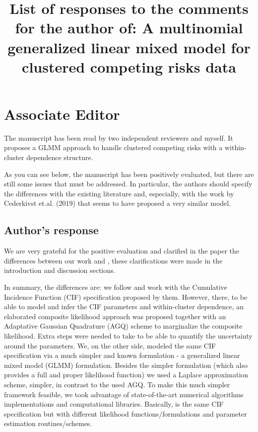 \documentclass[a4paper,12pt]{article}
\title{

  List of responses to the comments for the author of:
  A multinomial generalized linear mixed model for clustered competing
  risks data

}
\begin{document}
\maketitle

\section*{Associate Editor}

The manuscript has been read by two independent reviewers and myself. It
proposes a GLMM approach to handle clustered competing risks with a
within-cluster dependence structure.

As you can see below, the manuscript has been positively evaluated, but
there are still some issues that must be addressed. In particular, the
authors should specify the differences with the existing literature and,
especially, with the work by Cederkivst et.al. (2019) that seems to have
proposed a very similar model.

\subsection*{Author's response}

We are very grateful for the positive evaluation and clarified in the
paper the differences between our work and \cite{SCHEIKE}, these
clarifications were made in the introduction and discussion sections.

In summary, the differences are: we follow \cite{SCHEIKE} and work with
the Cumulative Incidence Function (CIF) specification proposed by
them. However, there, to be able to model and infer the CIF parameters
and within-cluster dependence, an elaborated composite likelihood
approach was proposed together with an Adaptative Gaussian Quadrature
(AGQ) scheme to marginalize the composite likelihood. Extra steps were
needed to take to be able to quantify the uncertainty around the
parameters. We, on the other side, modeled the same CIF specification
via a much simpler and known formulation - a generalized linear mixed
model (GLMM) formulation. Besides the simpler formulation (which also
provides a full and proper likelihood function) we used a Laplace
approximation scheme, simpler, in contrast to the used AGQ. To make this
much simpler framework feasible, we took advantage of state-of-the-art
numerical algorithms implementations and computational
libraries. Basically, is the same CIF specification but with different
likelihood functions/formulations and parameter estimation
routines/schemes.
\end{document}
